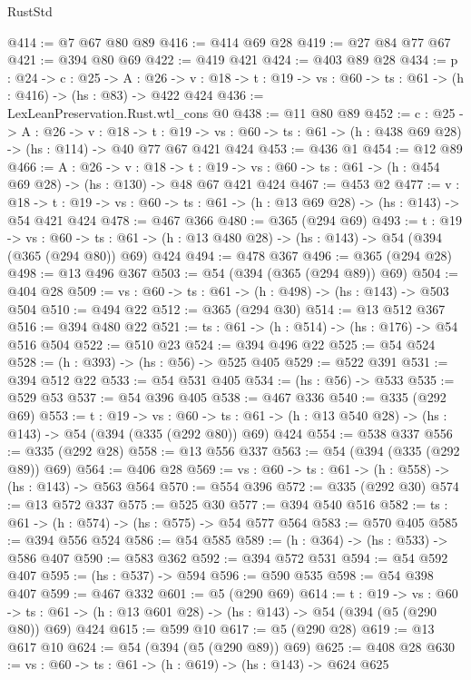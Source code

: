 \begin{lexlean}{RustStd}
\begin{coremodule}
{\begin{coremodule}
{{{{{{{{{{@414 := @7 @67 @80 @89
@416 := @414 @69 @28
@419 := @27 @84 @77 @67
@421 := @394 @80 @69
@422 := @419 @421
@424 := @403 @89 @28
@434 := {p : @24} ->
  {c : @25} ->
  {A : @26} ->
  {v : @18} -> {t : @19} -> {vs : @60} -> {ts : @61} -> (h : @416) -> (hs : @83) -> @422 @424
@436 := LexLeanPreservation.Rust.wtl_cons @0
@438 := @11 @80 @89
@452 := {c : @25} ->
  {A : @26} ->
  {v : @18} ->
  {t : @19} ->
  {vs : @60} -> {ts : @61} -> (h : @438 @69 @28) -> (hs : @114) -> @40 @77 @67 @421 @424
@453 := @436 @1
@454 := @12 @89
@466 := {A : @26} ->
  {v : @18} ->
  {t : @19} -> {vs : @60} -> {ts : @61} -> (h : @454 @69 @28) -> (hs : @130) -> @48 @67 @421 @424
@467 := @453 @2
@477 := {v : @18} ->
  {t : @19} -> {vs : @60} -> {ts : @61} -> (h : @13 @69 @28) -> (hs : @143) -> @54 @421 @424
@478 := @467 @366
@480 := @365 (@294 @69)
@493 := {t : @19} ->
  {vs : @60} ->
  {ts : @61} -> (h : @13 @480 @28) -> (hs : @143) -> @54 (@394 (@365 (@294 @80)) @69) @424
@494 := @478 @367
@496 := @365 (@294 @28)
@498 := @13 @496 @367
@503 := @54 (@394 (@365 (@294 @89)) @69)
@504 := @404 @28
@509 := {vs : @60} -> {ts : @61} -> (h : @498) -> (hs : @143) -> @503 @504
@510 := @494 @22
@512 := @365 (@294 @30)
@514 := @13 @512 @367
@516 := @394 @480 @22
@521 := {ts : @61} -> (h : @514) -> (hs : @176) -> @54 @516 @504
@522 := @510 @23
@524 := @394 @496 @22
@525 := @54 @524
@528 := (h : @393) -> (hs : @56) -> @525 @405
@529 := @522 @391
@531 := @394 @512 @22
@533 := @54 @531 @405
@534 := (hs : @56) -> @533
@535 := @529 @53
@537 := @54 @396 @405
@538 := @467 @336
@540 := @335 (@292 @69)
@553 := {t : @19} ->
  {vs : @60} ->
  {ts : @61} -> (h : @13 @540 @28) -> (hs : @143) -> @54 (@394 (@335 (@292 @80)) @69) @424
@554 := @538 @337
@556 := @335 (@292 @28)
@558 := @13 @556 @337
@563 := @54 (@394 (@335 (@292 @89)) @69)
@564 := @406 @28
@569 := {vs : @60} -> {ts : @61} -> (h : @558) -> (hs : @143) -> @563 @564
@570 := @554 @396
@572 := @335 (@292 @30)
@574 := @13 @572 @337
@575 := @525 @30
@577 := @394 @540 @516
@582 := {ts : @61} -> (h : @574) -> (hs : @575) -> @54 @577 @564
@583 := @570 @405
@585 := @394 @556 @524
@586 := @54 @585
@589 := (h : @364) -> (hs : @533) -> @586 @407
@590 := @583 @362
@592 := @394 @572 @531
@594 := @54 @592 @407
@595 := (hs : @537) -> @594
@596 := @590 @535
@598 := @54 @398 @407
@599 := @467 @332
@601 := @5 (@290 @69)
@614 := {t : @19} ->
  {vs : @60} ->
  {ts : @61} -> (h : @13 @601 @28) -> (hs : @143) -> @54 (@394 (@5 (@290 @80)) @69) @424
@615 := @599 @10
@617 := @5 (@290 @28)
@619 := @13 @617 @10
@624 := @54 (@394 (@5 (@290 @89)) @69)
@625 := @408 @28
@630 := {vs : @60} -> {ts : @61} -> (h : @619) -> (hs : @143) -> @624 @625
}}}}}}}}}}
\end{coremodule}}
\end{coremodule}
\end{lexlean}
